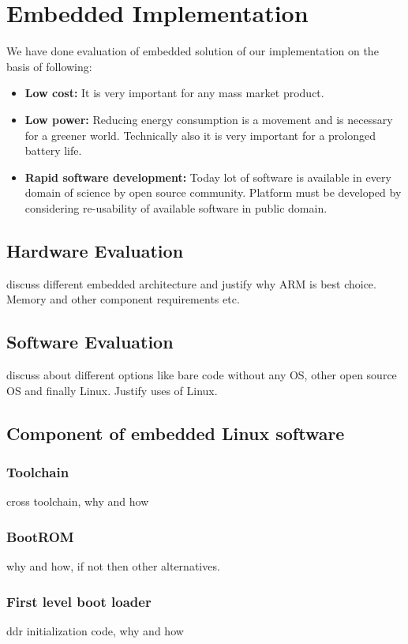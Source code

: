 
\chapter{Embedded Implementation} %
\label{Chapter3}
We have done evaluation of embedded solution of our implementation on
the basis of following:
\begin{itemize}
	\item \textbf{Low cost:} It is very important for any mass
		market product.
	\item \textbf{Low power:} Reducing energy consumption is a
		movement and is necessary for a greener world.
		Technically also it is very important for a prolonged
		battery life.
	\item \textbf{Rapid software development:} Today lot of software
		is available in every domain of science by open source
		community. Platform must be developed by considering
		re-usability of available software in public domain.
\end{itemize}
\section {Hardware Evaluation}
discuss different embedded architecture and justify why ARM is best
choice. Memory and other component requirements etc.
\section {Software Evaluation}
discuss about different options like bare code without any OS, other
open source OS and finally Linux. Justify uses of Linux.
\section {Component of embedded Linux software}
\subsection {Toolchain}
cross toolchain, why and how
\subsection {BootROM}
why and how, if not then other alternatives.
\subsection {First level boot loader}
ddr initialization code, why and how
